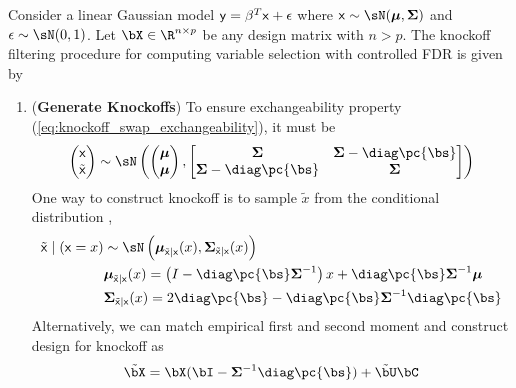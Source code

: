 \documentclass[11pt]{article}
\begin{document}
Consider a linear Gaussian model $\mathsf{y} = \beta^T\mathsf{x} + \epsilon$ where $\rx\sim\sN(\bmu,\bSigma)$ and $\epsilon\sim\sN(0,1)$. Let $\bX \in\R^{n\times p}$ be any design matrix with $n>p$. The knockoff filtering procedure for computing variable selection with controlled FDR is given by
\begin{enumerate}
    \item (\textbf{Generate Knockoffs}) 
    To ensure exchangeability property (\ref{eq:knockoff_swap_exchangeability}), it must be
    \begin{align*}
        \begin{pmatrix}
            \rx \\
            \tilde{\rx}
        \end{pmatrix}            
            \sim \sN\left(
                \begin{pmatrix}
                    \bmu \\ 
                    \bmu \\
                \end{pmatrix}, 
                \begin{bmatrix}
                    \bSigma & \bSigma - \diag\pc{\bs} \\
                    \bSigma - \diag\pc{\bs} & \bSigma \\
                \end{bmatrix}\right)
    \end{align*}
    One way to construct knockoff is to sample $\tilde{x}$ from the conditional distribution \cite{candesPanningGoldModelX2017,gimenezKnockoffsMassNew2019},
    \begin{align*}
        \tilde{\rx} \mid (\rx = x)
            &\sim \sN\left(
                \bmu_{\tilde{\rx}|\rx}(x), \bSigma_{\tilde{\rx}|\rx}(x)
            \right) \\
        &\bmu_{\tilde{\rx}|\rx}(x) 
            = \left (I - \diag\pc{\bs}\bSigma^{-1}\right) x + \diag\pc{\bs}\bSigma^{-1} \bmu\\
        &\bSigma_{\tilde{\rx}|\rx}(x)
            = 2\diag\pc{\bs} - \diag\pc{\bs}\bSigma^{-1}\diag\pc{\bs}
    \end{align*}
    Alternatively, we can match empirical first and second moment \cite{barberControllingFalseDiscovery2015} and construct design for knockoff as 
    \begin{align*}
        \tilde{\bX}
            = \bX(\bI - \bSigma^{-1}\diag\pc{\bs}) + \tilde{\bU}\bC
    \end{align*}

\end{enumerate}
\end{document}
